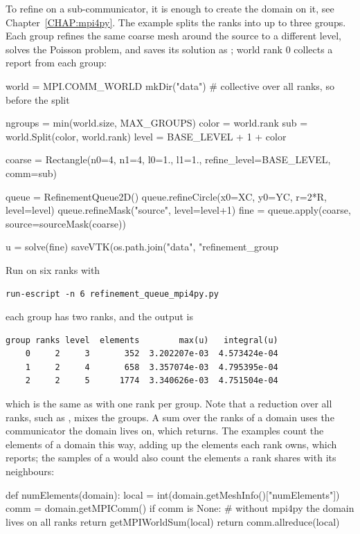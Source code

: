 To refine on a sub-communicator, it is enough to create the
domain on it, see Chapter~\ref{CHAP:mpi4py}. The example
 splits the ranks into up to three groups.
Each group refines the same coarse mesh around the source to a different
level, solves the Poisson problem, and saves its solution as
; world rank 0 collects a report from each
group:
\begin{python}
world = MPI.COMM_WORLD
mkDir("data")      # collective over all ranks, so before the split

ngroups = min(world.size, MAX_GROUPS)
color = world.rank %
sub = world.Split(color, world.rank)
level = BASE_LEVEL + 1 + color

coarse = Rectangle(n0=4, n1=4, l0=1., l1=1., refine_level=BASE_LEVEL, comm=sub)

queue = RefinementQueue2D()
queue.refineCircle(x0=XC, y0=YC, r=2*R, level=level)
queue.refineMask("source", level=level+1)
fine = queue.apply(coarse, source=sourceMask(coarse))

u = solve(fine)
saveVTK(os.path.join("data", "refinement_group%
\end{python}
Run on six ranks with
\begin{verbatim}
run-escript -n 6 refinement_queue_mpi4py.py
\end{verbatim}
each group has two ranks, and the output is
\begin{verbatim}
group ranks level  elements        max(u)   integral(u)
    0     2     3       352  3.202207e-03  4.573424e-04
    1     2     4       658  3.357074e-03  4.795395e-04
    2     2     5      1774  3.340626e-03  4.751504e-04
\end{verbatim}
which is the same as with one rank per group. Note that a reduction over all
ranks, such as , mixes the groups. A sum over the
ranks of a domain uses the communicator the domain lives on, which
 returns. The examples count the elements of a domain this
way, adding up the elements each rank owns, which 
reports; the samples of a  would also count the elements a
rank shares with its neighbours:
\begin{python}
def numElements(domain):
    local = int(domain.getMeshInfo()["numElements"])
    comm = domain.getMPIComm()
    if comm is None:     # without mpi4py the domain lives on all ranks
        return getMPIWorldSum(local)
    return comm.allreduce(local)
\end{python}

